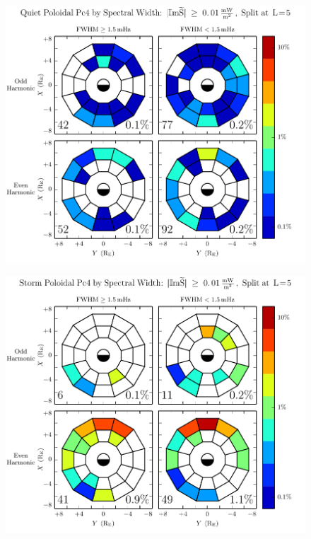 \begin{figure}[!htb]
    \centering
    \includegraphics[width=\textwidth]{figures/fwhm_rate_p_calm.pdf}
    \caption[Poloidal Pc4 Rate by Compressional Coupling: Dst$\geq \SI{-30}{\nT}$]{
      \todo{$\cdots$}
    }
    \label{fig_fwhm_rate_p_calm}
\end{figure}

\begin{figure}[!htb]
    \centering
    \includegraphics[width=\textwidth]{figures/fwhm_rate_p_storm.pdf}
    \caption[Poloidal Pc4 Rate by Compressional Coupling: Dst$< \SI{-30}{\nT}$]{
      \todo{$\cdots$}
    }
    \label{fig_fwhm_rate_p_storm}
\end{figure}

